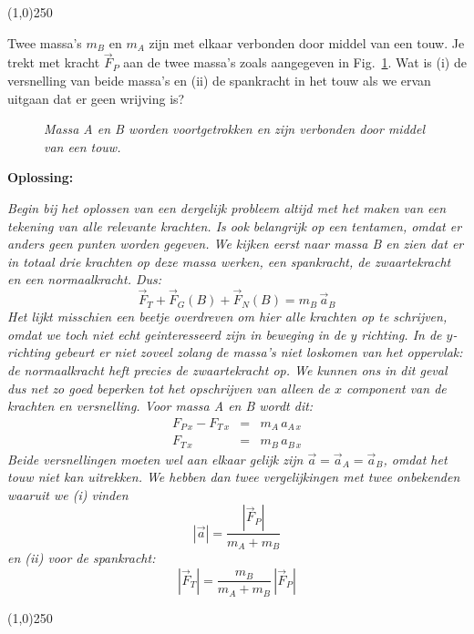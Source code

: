 \begin{center}
\line(1,0){250}
\end{center}
\begin{voorbeeld} 
\label{ex:spankracht}
Twee massa's $m_B$ en $m_A$ zijn met elkaar verbonden door middel van een touw. Je
trekt met kracht $\vec{F}_P$ aan de twee massa's zoals aangegeven in Fig.~\ref{fig:span}. 
Wat is (i) de versnelling van beide massa's en (ii) de spankracht in het touw als we ervan
uitgaan dat er geen wrijving is?

\begin{figure}[htbp]
\begin{center}
\caption{{\it Massa A en B worden voortgetrokken en zijn verbonden door middel van een touw.}}
\label{fig:span}
\end{center}
\end{figure} 
{\bf Oplossing: } {\it Begin bij het oplossen van een dergelijk probleem {\it altijd} met het
maken van een tekening van alle relevante krachten. Is ook belangrijk op een tentamen, omdat
er anders geen punten worden gegeven. We kijken eerst naar massa B en zien dat er in totaal
drie krachten op deze massa werken, een spankracht, de zwaartekracht en een normaalkracht.
Dus:
\begin{equation}
\vec{F}_T +\vec{F}_G(B)+\vec{F}_N(B)= m_B\, \vec{a}_B
\end{equation}
Het lijkt misschien een beetje overdreven om hier alle krachten op te schrijven, omdat we toch
niet echt geinteresseerd zijn in beweging in de $y$ richting. In de $y$-richting gebeurt er niet
zoveel zolang de massa's niet loskomen van het oppervlak: de normaalkracht heft precies de
zwaartekracht op. We kunnen ons in dit geval dus
net zo goed beperken tot het opschrijven van alleen de $x$ component van de krachten
en versnelling. Voor massa A en B wordt dit:
\begin{eqnarray}
F_{P\,x} - F_{T\,x} & = & m_A\,a_{A\,x}\\
F_{T\,x} & = & m_B\,a_{B\,x} 
\end{eqnarray}
Beide versnellingen moeten wel aan elkaar gelijk zijn $\vec{a}=\vec{a}_A=\vec{a}_B$, omdat het touw niet kan uitrekken. We
hebben dan twee vergelijkingen met twee onbekenden waaruit we (i) vinden
\begin{equation}
|\vec{a}| = \frac{|\vec{F}_P|}{m_A+m_B}
\end{equation}
en (ii) voor de spankracht:
\begin{equation}
|\vec{F}_T| = \frac{m_B}{m_A+m_B}\,|\vec{F}_P|
\end{equation}

 }
\end{voorbeeld}
\begin{center}
\line(1,0){250}
\end{center}


